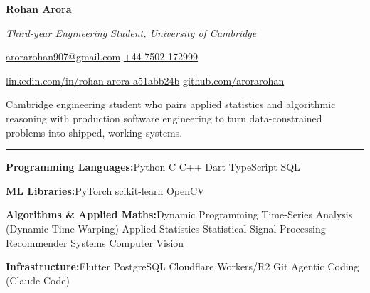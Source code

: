 \documentclass[11pt]{article}
\newcommand{\cvsection}[1]{%
  \vspace{10pt}%
  \noindent{\large\bfseries\MakeUppercase{#1}}\par
  \vspace{-4pt}\noindent\rule{\linewidth}{0.7pt}\vspace{4pt}%
}
\newcommand{\sep}{\quad\textbar\quad}
\begin{document}
\begin{center}
  {\Huge\bfseries Rohan Arora}\par
  \vspace{4pt}
  {\Large\itshape Third-year Engineering Student, University of Cambridge}\par
  \vspace{6pt}
  \href{mailto:arorarohan907@gmail.com}{arorarohan907@gmail.com}
  \sep
  \href{tel:+447502172999}{+44 7502 172999}\par
  \vspace{2pt}
  \href{https://www.linkedin.com/in/rohan-arora-a51abb24b/}{linkedin.com/in/rohan-arora-a51abb24b}
  \sep \href{https://github.com/arorarohan}{github.com/arorarohan}
\end{center}

\vspace{6pt}

Cambridge engineering student who pairs applied statistics and algorithmic reasoning with production software engineering to turn data-constrained problems into shipped, working systems.

\cvsection{Skills}
\textbf{Programming Languages:}\quad\quad Python \sep C \sep C++ \sep Dart \sep TypeScript \sep SQL

\textbf{ML Libraries:}\quad\quad PyTorch \sep scikit-learn \sep OpenCV

\textbf{Algorithms \& Applied Maths:}\quad\quad Dynamic Programming \sep Time-Series Analysis (Dynamic Time Warping) \sep Applied Statistics \sep Statistical Signal Processing \sep Recommender Systems \sep Computer Vision

\textbf{Infrastructure:}\quad\quad Flutter \sep PostgreSQL \sep Cloudflare Workers\slash R2 \sep Git \sep Agentic Coding (Claude Code)

\end{document}
